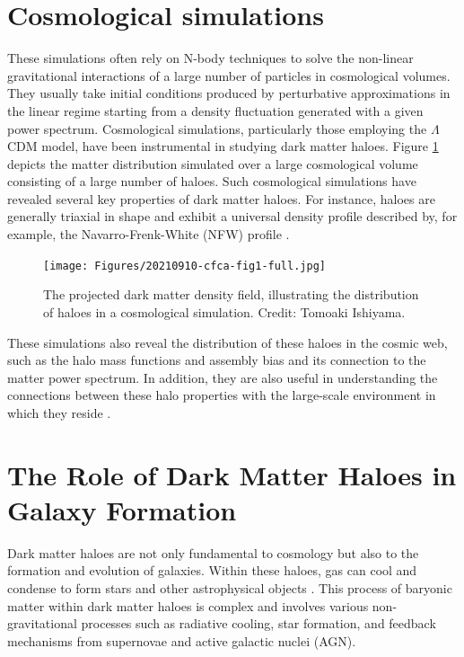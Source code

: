 \section{Cosmological simulations}

These simulations often rely on N-body techniques to solve the non-linear gravitational interactions of a large number of particles in cosmological volumes. They usually take initial conditions produced by perturbative approximations in the linear regime starting from a density fluctuation generated with a given power spectrum. Cosmological simulations, particularly those employing the $\Lambda$CDM model, have been instrumental in studying dark matter haloes. Figure \ref{fig:dm-cosmo-sims-haloes} depicts the matter distribution simulated over a large cosmological volume consisting of a large number of haloes. Such cosmological simulations have revealed several key properties of dark matter haloes. For instance, haloes are generally triaxial in shape \citep[][]{1988ApJ...327..507F} and exhibit a universal density profile described by, for example, the Navarro-Frenk-White (NFW) profile \citep{1996ApJ...462..563N,1997ApJ...490..493N,2010MNRAS.402...21N}.

\begin{figure}
\centering
\texttt{[image: Figures/20210910-cfca-fig1-full.jpg]}
\caption{The projected dark matter density field, illustrating the distribution of haloes in a cosmological simulation. Credit: Tomoaki Ishiyama.}
\label{fig:dm-cosmo-sims-haloes}
\end{figure}

These simulations also reveal the distribution of these haloes in the cosmic web, such as the halo mass functions and assembly bias and its connection to the matter power spectrum. In addition, they are also useful in understanding the connections between these halo properties with the large-scale environment in which they reside \cite[see e.g.][]{2021MNRAS.503.2053R,2022MNRAS.516.5849R}.

\section{The Role of Dark Matter Haloes in Galaxy Formation}

Dark matter haloes are not only fundamental to cosmology but also to the formation and evolution of galaxies. Within these haloes, gas can cool and condense to form stars and other astrophysical objects \citep{1988MNRAS.234..459S,1998MNRAS.295..319M}. This process of baryonic matter within dark matter haloes is complex and involves various non-gravitational processes such as radiative cooling, star formation, and feedback mechanisms from supernovae and active galactic nuclei (AGN).

